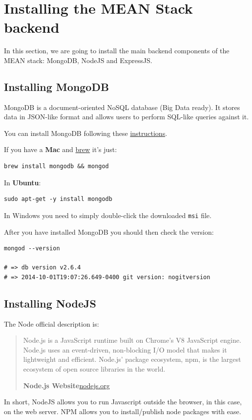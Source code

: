 \documentclass[12pt]{article}
\begin{document}
\section{Installing the MEAN Stack backend}

In this section, we are going to install the main backend components of the
MEAN stack: MongoDB, NodeJS and ExpressJS.

\subsection{Installing MongoDB}

MongoDB is a document-oriented NoSQL database (Big Data ready). It
stores data in JSON-like format and allows users to perform SQL-like
queries against it.

You can install MongoDB following these
\href{http://docs.mongodb.org/manual/installation/}{instructions}.

If you have a \textbf{Mac} and \href{http://brew.sh/}{brew} it's just:
\begin{Verbatim}
brew install mongodb && mongod
\end{Verbatim}

In \textbf{Ubuntu}:
\begin{Verbatim}
sudo apt-get -y install mongodb
\end{Verbatim}

In Windows you need to simply double-click the downloaded \verb!msi! file.

After you have installed MongoDB you should then check the version:
\begin{Verbatim}
mongod --version

# => db version v2.6.4
# => 2014-10-01T19:07:26.649-0400 git version: nogitversion
\end{Verbatim}

\subsection{Installing NodeJS}

The Node official description is:
\begin{quote}
Node.js is a JavaScript runtime built on Chrome's V8 JavaScript engine.
Node.js uses an event-driven, non-blocking I/O model that makes it
lightweight and efficient. Node.js' package ecosystem, npm, is the
largest ecosystem of open source libraries in the world.

\textbf{Node.js Website}\href{https://nodejs.org}{nodejs.org}
\end{quote}
In short, NodeJS allows you to run Javascript outside the browser, in
this case, on the web server. NPM allows you to install/publish node
packages with ease.
\end{document}
